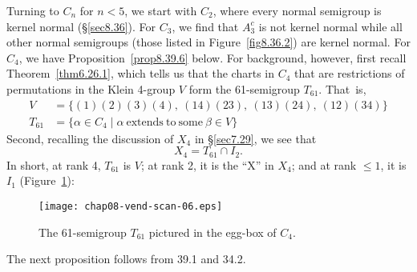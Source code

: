 \documentclass{surv-l}
\numberwithin{equation}{section}
\numberwithin{table}{section}
\numberwithin{figure}{section}
\theoremstyle{plain}
\theoremstyle{definition}
\begin{document}
Turning to $C_{n}$ for $n <5$, we start with $C_{2}$, where every
normal semigroup is kernel normal (\S\ref{sec8.36}). For $C_{3}$,
we find that $A_{3}^{c}$ is not kernel normal while all other
normal semigroups (those listed in Figure~\ref{fig8.36.2}) are
kernel normal. For $C_{4}$, we have Proposition~\ref{prop8.39.6}
below. For background, however, first recall
Theorem~\ref{thm6.26.1}, which tells us that the charts in $C_{4}$
that are restrictions of permutations in the Klein 4-group $V$
form the 61-semigroup $T_{61}$. That~is,
\begin{align*}
V&=\{(1)(2)(3)(4),\ (14)(23),\ (13)(24),\ (12)(34)\} \\
T_{61} &=\{\alpha\in C_{4}\mid \alpha\ \mathrm{extends\ to\ some}\ \beta\in V\}
\end{align*}
Second, recalling the discussion of $X_{4}$ in \S\ref{sec7.29}, we
see that
\[
X_{4}=T_{61}\cap I_{2}.
\]
In short, at rank 4, $T_{61}$ is $V$; at
rank 2, it is the ``X'' in $X_{4}$; and at rank $\leq
1$, it is $I_{1}$ (Figure~\ref{fig8.39.5}):

\setcounter{figure}{4}
\begin{figure}[!h]
\texttt{[image: chap08-vend-scan-06.eps]}
\caption{The 61-semigroup $T_{61}$ pictured in the egg-box of $C_{4}$.}\label{fig8.39.5}
\end{figure}

The next proposition follows from 39.1 and 34.2.
\end{document}
